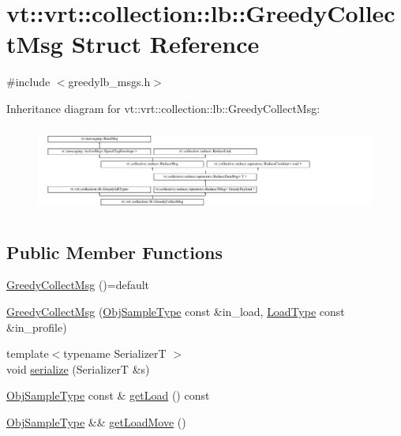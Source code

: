 \hypertarget{structvt_1_1vrt_1_1collection_1_1lb_1_1_greedy_collect_msg}{}\section{vt\+:\+:vrt\+:\+:collection\+:\+:lb\+:\+:Greedy\+Collect\+Msg Struct Reference}
\label{structvt_1_1vrt_1_1collection_1_1lb_1_1_greedy_collect_msg}


{\ttfamily \#include $<$greedylb\+\_\+msgs.\+h$>$}

Inheritance diagram for vt\+:\+:vrt\+:\+:collection\+:\+:lb\+:\+:Greedy\+Collect\+Msg\+:\begin{figure}[H]
\begin{center}
\leavevmode
\includegraphics[height=2.886598cm]{structvt_1_1vrt_1_1collection_1_1lb_1_1_greedy_collect_msg}
\end{center}
\end{figure}
\subsection*{Public Member Functions}
\begin{DoxyCompactItemize}
\item 
\hyperlink{structvt_1_1vrt_1_1collection_1_1lb_1_1_greedy_collect_msg_aed72919af1ca749e8502d892f8da495c}{Greedy\+Collect\+Msg} ()=default
\item 
\hyperlink{structvt_1_1vrt_1_1collection_1_1lb_1_1_greedy_collect_msg_ae619491c14d7adf736c32f14e90fdee1}{Greedy\+Collect\+Msg} (\hyperlink{structvt_1_1vrt_1_1collection_1_1lb_1_1_greedy_l_b_types_a467f8a79d0785fca5fc95bd5c0f406b9}{Obj\+Sample\+Type} const \&in\+\_\+load, \hyperlink{structvt_1_1vrt_1_1collection_1_1lb_1_1_greedy_l_b_types_a9fe8829bc0c92e88ddf9d149233a54f4}{Load\+Type} const \&in\+\_\+profile)
\item 
{\footnotesize template$<$typename SerializerT $>$ }\\void \hyperlink{structvt_1_1vrt_1_1collection_1_1lb_1_1_greedy_collect_msg_ac0f5ca855ef36a56595e6ab019cf9487}{serialize} (SerializerT \&s)
\item 
\hyperlink{structvt_1_1vrt_1_1collection_1_1lb_1_1_greedy_l_b_types_a467f8a79d0785fca5fc95bd5c0f406b9}{Obj\+Sample\+Type} const  \& \hyperlink{structvt_1_1vrt_1_1collection_1_1lb_1_1_greedy_collect_msg_a6455aa0e3d5468d08a801c679b2d2d80}{get\+Load} () const
\item 
\hyperlink{structvt_1_1vrt_1_1collection_1_1lb_1_1_greedy_l_b_types_a467f8a79d0785fca5fc95bd5c0f406b9}{Obj\+Sample\+Type} \&\& \hyperlink{structvt_1_1vrt_1_1collection_1_1lb_1_1_greedy_collect_msg_a83ba5b561927582a06451672f95999a4}{get\+Load\+Move} ()
\end{DoxyCompactItemize}
